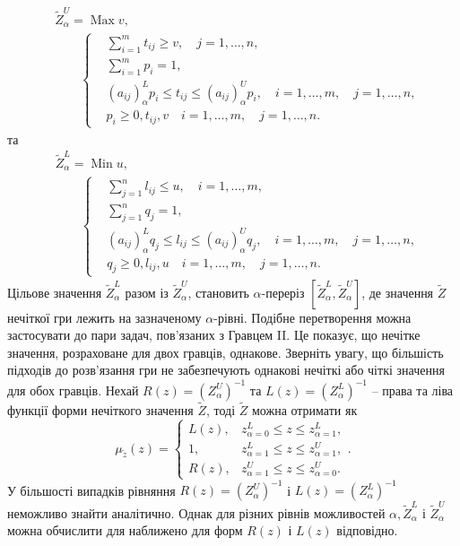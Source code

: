 \documentclass[14pt, a4paper, oneside]{extarticle}
\numberwithin{equation}{section}
\newcommand{\geqslant}{\geq}
\newcommand{\leqslant}{\leq}
\begin{document}
\begin{equation*}
\begin{aligned}
& \tilde{Z}_{\alpha}^{U}= \operatorname{Max} v, \\
& \qquad\left\{\begin{aligned}
& \sum_{i=1}^{m} t_{i j} \geqslant v, \quad j=1, \ldots, n, \\
& \sum_{i=1}^{m} p_{i}=1, \\
& \left(a_{i j}\right)_{\alpha}^{L} p_{i} \leqslant t_{i j} \leqslant\left(a_{i j}\right)_{\alpha}^{U} p_{i}, \quad i=1, \ldots, m,\quad j=1, \ldots, n, \\
& p_{i} \geqslant 0, t_{i j}, v \quad i=1, \ldots, m, \quad j=1, \ldots, n .
\end{aligned}\right.
\end{aligned}
\end{equation*}
та
\begin{equation*}
\begin{aligned}
& \tilde{Z}_{\alpha}^{L}= \operatorname{Min} u, \\
& \qquad\left\{\begin{aligned}
& \sum_{j=1}^{n} l_{i j} \leqslant u, \quad i=1, \ldots, m, \\
& \sum_{j=1}^{n} q_{j}=1, \\
& \left(a_{i j}\right)_{\alpha}^{L} q_{j} \leqslant l_{i j} \leqslant\left(a_{i j}\right)_{\alpha}^{U} q_{j}, \quad i=1, \ldots, m,\quad j=1, \ldots, n, \\
& q_{j} \geqslant 0, l_{i j}, u \quad i=1, \ldots, m,\quad j=1, \ldots, n .
\end{aligned}\right.
\end{aligned}
\end{equation*}
Цільове значення $\tilde{Z}_{\alpha}^{L}$ разом із $\tilde{Z}_{\alpha}^{U}$, становить $\alpha$-переріз $\left[\tilde{Z}_{\alpha}^{L}, \tilde{Z}_{\alpha}^{U}\right]$, де значення $\tilde {Z}$ нечіткої гри лежить на зазначеному $\alpha$-рівні. Подібне перетворення можна застосувати до пари задач, пов'язаних з Гравцем II. Це показує, що нечітке значення, розраховане для двох гравців, однакове. Зверніть увагу, що більшість підходів до розв'язання гри не забезпечують однакові нечіткі або чіткі значення для обох гравців. Нехай $R(z)=\left(Z_{\alpha}^{U}\right)^{-1}$ та $L(z)=\left(Z_{\alpha}^{L}\right) ^{-1}$ -- права та ліва функції форми нечіткого значення $\tilde{Z}$, тоді $\tilde{Z}$ можна отримати як
\begin{equation*}
\mu_{\tilde{z}}(z)=\left\{\begin{array}{ll}
L(z), & z_{\alpha=0}^{L} \leqslant z \leqslant z_{\alpha=1}^{L}, \\
1, & z_{\alpha=1}^{L} \leqslant z \leqslant z_{\alpha=1}^{U}, \\
R(z), & z_{\alpha=1}^{U} \leqslant z \leqslant z_{\alpha=0}^{U} .
\end{array} .\right.
\end{equation*}
У більшості випадків рівняння $R(z)=\left(Z_{\alpha}^{U}\right)^{-1}$ і $L(z)=\left(Z_{\alpha}^{L}\right)^{-1}$ неможливо знайти аналітично. Однак для різних рівнів можливостей $\alpha, \tilde{Z}_{\alpha}^{L}$ і $\tilde{Z}_{\alpha}^{U}$ можна обчислити для наближено для форм $R(z)$ і $L(z)$ відповідно.
\end{document}
